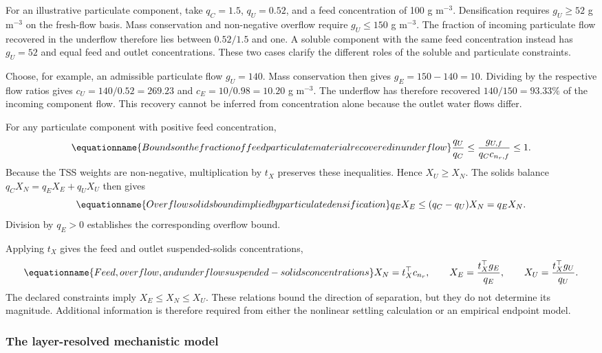 For an illustrative particulate component, take $q_C=1.5$, $q_U=0.52$, and a feed concentration of 100 g m$^{-3}$. Densification requires $g_U\ge52$ g m$^{-3}$ on the fresh-flow basis. Mass conservation and non-negative overflow require $g_U\le150$ g m$^{-3}$. The fraction of incoming particulate flow recovered in the underflow therefore lies between $0.52/1.5$ and one. A soluble component with the same feed concentration instead has $g_U=52$ and equal feed and outlet concentrations. These two cases clarify the different roles of the soluble and particulate constraints.

Choose, for example, an admissible particulate flow $g_U=140$. Mass conservation then gives $g_E=150-140=10$. Dividing by the respective flow ratios gives $c_U=140/0.52=269.23$ and $c_E=10/0.98=10.20$ g m$^{-3}$. The underflow has therefore recovered $140/150=93.33\%$ of the incoming component flow. This recovery cannot be inferred from concentration alone because the outlet water flows differ.

For any particulate component with positive feed concentration,
\begin{equation}
\equationname{Bounds on the fraction of feed particulate material recovered in underflow}
\frac{q_U}{q_C}\le\frac{g_{U,f}}{q_Cc_{n_r,f}}\le1.
\end{equation}
Because the TSS weights are non-negative, multiplication by $t_X$ preserves these inequalities. Hence $X_U\ge X_N$. The solids balance $q_CX_N=q_EX_E+q_UX_U$ then gives
\begin{equation}
\equationname{Overflow solids bound implied by particulate densification}
q_EX_E\le(q_C-q_U)X_N=q_EX_N.
\end{equation}
Division by $q_E>0$ establishes the corresponding overflow bound.

Applying $t_X$ gives the feed and outlet suspended-solids concentrations,
\begin{equation}
\equationname{Feed, overflow, and underflow suspended-solids concentrations}
X_N=t_X^\top c_{n_r},\qquad
X_E=\frac{t_X^\top g_E}{q_E},\qquad
X_U=\frac{t_X^\top g_U}{q_U}.
\label{eq:plant_tss_endpoints}
\end{equation}
The declared constraints imply $X_E\le X_N\le X_U$. These relations bound the direction of separation, but they do not determine its magnitude. Additional information is therefore required from either the nonlinear settling calculation or an empirical endpoint model.

\subsubsection{The layer-resolved mechanistic model}

